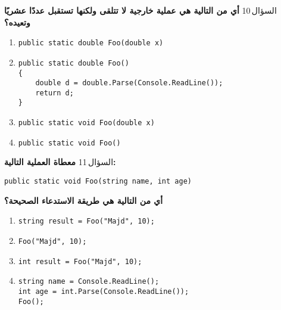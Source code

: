 \documentclass[13pt]{beamer}
\begin{document}
\begin{frame}[fragile]{السؤال\,10}
\textbf{أي من التالية هي عملية خارجية لا تتلقى ولكنها تستقبل عددًا عشريًا وتعيده؟}

\begin{english}
\begin{enumerate}[label=(\alph*)]
  \item \texttt{public static double Foo(double x)}
  \item
  \begin{lstlisting}[language=CSharp]
public static double Foo()
{
    double d = double.Parse(Console.ReadLine());
    return d;
}
  \end{lstlisting}
  \item \texttt{public static void Foo(double x)}
  \item \texttt{public static void Foo()}
\end{enumerate}
\end{english}
\end{frame}

\begin{frame}[fragile]{السؤال\,11}
\textbf{معطاة العملية التالية:}

\begin{english}
\begin{lstlisting}[language=CSharp]
public static void Foo(string name, int age)
\end{lstlisting}
\end{english}

\textbf{أي من التالية هي طريقة الاستدعاء الصحيحة؟}

\begin{english}
\begin{enumerate}[label=(\alph*)]
  \item \texttt{string result = Foo("Majd", 10);}
  \item \texttt{Foo("Majd", 10);}
  \item \texttt{int result = Foo("Majd", 10);}
  \item
  \begin{lstlisting}[language=CSharp]
string name = Console.ReadLine();
int age = int.Parse(Console.ReadLine());
Foo();
  \end{lstlisting}
\end{enumerate}
\end{english}
\end{frame}
\end{document}
